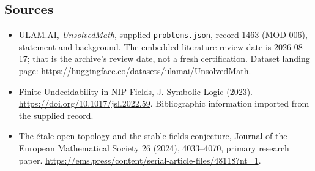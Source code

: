 \documentclass[11pt,a4paper]{article}
\begin{document}
\subsection{Sources}

{\small

\begin{itemize}

\item[\hypertarget{source:1463:1}{S1}] ULAM.AI, \emph{UnsolvedMath}, supplied \texttt{problems.json}, record 1463 (MOD-006), statement and background. The embedded literature-review date is 2026-08-17; that is the archive’s review date, not a fresh certification. Dataset landing page: \url{https://huggingface.co/datasets/ulamai/UnsolvedMath}.

\item[\hypertarget{source:1463:2}{S2}] Finite Undecidability in NIP Fields, J. Symbolic Logic (2023). \url{https://doi.org/10.1017/jsl.2022.59}. Bibliographic information imported from the supplied record.

\item[R1] The étale-open topology and the stable fields conjecture, Journal of the European Mathematical Society 26 (2024), 4033--4070, primary research paper.
\url{https://ems.press/content/serial-article-files/48118?nt=1}.
\end{itemize}

}

\label{end:1463}
\end{document}

